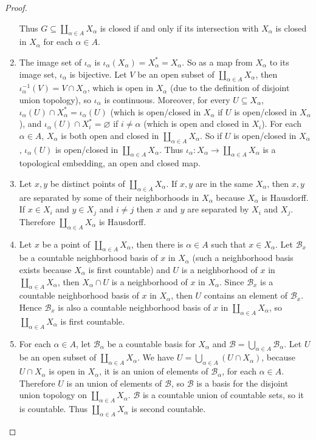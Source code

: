 \begin{proof}
\begin{enumerate}[label={(\alph*)}]
		      Thus $G\subseteq \coprod_{\alpha\in A}X_{\alpha}$ is closed if and only if its intersection with $X_{\alpha}$ is closed in $X_{\alpha}$ for each $\alpha\in A$.
		\item The image set of $\iota_{\alpha}$ is $\iota_{\alpha}(X_{\alpha}) = X_{\alpha}^{*} = X_{\alpha}$. So as a map from $X_{\alpha}$ to its image set, $\iota_{\alpha}$ is bijective. Let $V$ be an open subset of $\coprod_{\alpha\in A}X_{\alpha}$, then $\iota_{\alpha}^{-1}(V) = V\cap X_{\alpha}$, which is open in $X_{\alpha}$ (due to the definition of disjoint union topology), so $\iota_{\alpha}$ is continuous. Moreover, for every $U\subseteq X_{\alpha}$, $\iota_{\alpha}(U)\cap X_{\alpha}^{*} = \iota_{\alpha}(U)$ (which is open/closed in $X_{\alpha}$ if $U$ is open/closed in $X_{\alpha}$), and $\iota_{\alpha}(U)\cap X^{*}_{i} = \varnothing$ if $i\ne \alpha$ (which is open and closed in $X_{i}$). For each $\alpha\in A$, $X_{\alpha}$ is both open and closed in $\coprod_{\alpha\in A}X_{\alpha}$. So if $U$ is open/closed in $X_{\alpha}$, $\iota_{\alpha}(U)$ is open/closed in $\coprod_{\alpha\in A}X_{\alpha}$. Thus $\iota_{\alpha}: X_{\alpha}\to \coprod_{\alpha\in A}X_{\alpha}$ is a topological embedding, an open and closed map.
		\item Let $x, y$ be distinct points of $\coprod_{\alpha\in A}X_{\alpha}$. If $x, y$ are in the same $X_{\alpha}$, then $x, y$ are separated by some of their neighborhoods in $X_{\alpha}$ because $X_{\alpha}$ is Hausdorff. If $x\in X_{i}$ and $y\in X_{j}$ and $i\ne j$ then $x$ and $y$ are separated by $X_{i}$ and $X_{j}$. Therefore $\coprod_{\alpha\in A}X_{\alpha}$ is Hausdorff.
		\item Let $x$ be a point of $\coprod_{\alpha\in A}X_{\alpha}$, then there is $\alpha\in A$ such that $x\in X_{\alpha}$. Let $\mathscr{B}_{x}$ be a countable neighborhood basis of $x$ in $X_{\alpha}$ (such a neighborhood basis exists because $X_{\alpha}$ is first countable) and $U$ is a neighborhood of $x$ in $\coprod_{\alpha\in A}X_{\alpha}$, then $X_{\alpha}\cap U$ is a neighborhood of $x$ in $X_{\alpha}$. Since $\mathscr{B}_{x}$ is a countable neighborhood basis of $x$ in $X_{\alpha}$, then $U$ contains an element of $\mathscr{B}_{x}$. Hence $\mathscr{B}_{x}$ is also a countable neighborhood basis of $x$ in $\coprod_{\alpha\in A}X_{\alpha}$, so $\coprod_{\alpha\in A}X_{\alpha}$ is first countable.
		\item For each $\alpha\in A$, let $\mathscr{B}_{\alpha}$ be a countable basis for $X_{\alpha}$ and $\mathscr{B} = \bigcup_{\alpha\in A}\mathscr{B}_{\alpha}$. Let $U$ be an open subset of $\coprod_{\alpha\in A}X_{\alpha}$. We have $U = \bigcup_{\alpha\in A}(U\cap X_{\alpha})$, because $U\cap X_{\alpha}$ is open in $X_{\alpha}$, it is an union of elements of $\mathscr{B}_{\alpha}$, for each $\alpha\in A$. Therefore $U$ is an union of elements of $\mathscr{B}$, so $\mathscr{B}$ is a basis for the disjoint union topology on $\coprod_{\alpha\in A}X_{\alpha}$. $\mathscr{B}$ is a countable union of countable sets, so it is countable. Thus $\coprod_{\alpha\in A}X_{\alpha}$ is second countable.
	\end{enumerate}
\end{proof}

